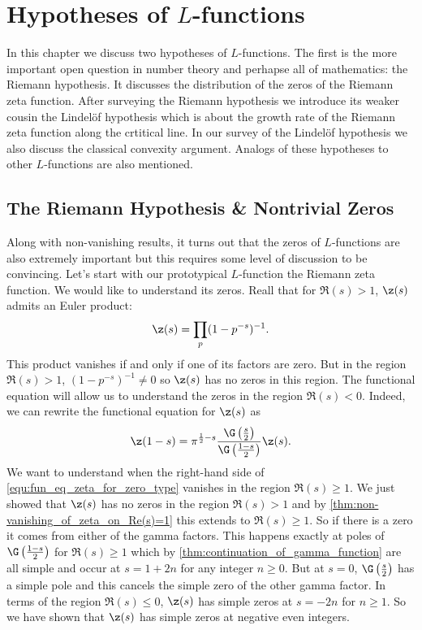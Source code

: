 \chapter{Hypotheses of \texorpdfstring{$L$}{L}-functions}
  In this chapter we discuss two hypotheses of $L$-functions. The first is the more important open question in number theory and perhapse all of mathematics: the Riemann hypothesis. It discusses the distribution of the zeros of the Riemann zeta function. After surveying the Riemann hypothesis we introduce its weaker cousin the Lindel\"of hypothesis which is about the growth rate of the Riemann zeta function along the crtitical line. In our survey of the Lindel\"of hypothesis we also discuss the classical convexity argument. Analogs of these hypotheses to other $L$-functions are also mentioned.
  \section{The Riemann Hypothesis \& Nontrivial Zeros}
      Along with non-vanishing results, it turns out that the zeros of $L$-functions are also extremely important but this requires some level of discussion to be convincing. Let's start with our prototypical $L$-function the Riemann zeta function. We would like to understand its zeros. Reall that for $\Re(s) > 1$, $\z(s)$ admits an Euler product:
      \[
        \z(s) = \prod_{p}(1-p^{-s})^{-1}.
      \]
      This product vanishes if and only if one of its factors are zero. But in the region $\Re(s) > 1$, $(1-p^{-s})^{-1} \neq 0$ so $\z(s)$ has no zeros in this region. The functional equation will allow us to understand the zeros in the region $\Re(s) < 0$. Indeed, we can rewrite the functional equation for $\z(s)$ as
      \begin{equation}\label{equ:fun_eq_zeta_for_zero_type}
        \z(1-s) = \pi^{\frac{1}{2}-s}\frac{\G\left(\frac{s}{2}\right)}{\G\left(\frac{1-s}{2}\right)}\z(s).
      \end{equation}
      We want to understand when the right-hand side of \cref{equ:fun_eq_zeta_for_zero_type} vanishes in the region $\Re(s) \ge 1$. We just showed that $\z(s)$ has no zeros in the region $\Re(s) > 1$ and by \cref{thm:non-vanishing_of_zeta_on_Re(s)=1} this extends to $\Re(s) \ge 1$. So if there is a zero it comes from either of the gamma factors. This happens exactly at poles of $\G\left(\frac{1-s}{2}\right)$ for $\Re(s) \ge 1$ which by \cref{thm:continuation_of_gamma_function} are all simple and occur at $s = 1+2n$ for any integer $n \ge 0$. But at $s = 0$, $\G\left(\frac{s}{2}\right)$ has a simple pole and this cancels the simple zero of the other gamma factor. In terms of the region $\Re(s) \le 0$, $\z(s)$ has simple zeros at $s = -2n$ for $n \ge 1$. So we have shown that $\z(s)$ has simple zeros at negative even integers.

